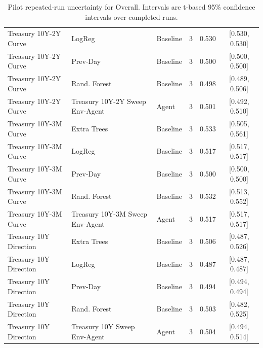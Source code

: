 \begin{table}[t]
\begin{tabular}{llllcc}
Treasury 10Y-2Y Curve & LogReg & Baseline & 3 & 0.530 & [0.530, 0.530] \\
Treasury 10Y-2Y Curve & Prev-Day & Baseline & 3 & 0.500 & [0.500, 0.500] \\
Treasury 10Y-2Y Curve & Rand. Forest & Baseline & 3 & 0.498 & [0.489, 0.506] \\
Treasury 10Y-2Y Curve & Treasury 10Y-2Y Sweep Env-Agent & Agent & 3 & 0.501 & [0.492, 0.510] \\
Treasury 10Y-3M Curve & Extra Trees & Baseline & 3 & 0.533 & [0.505, 0.561] \\
Treasury 10Y-3M Curve & LogReg & Baseline & 3 & 0.517 & [0.517, 0.517] \\
Treasury 10Y-3M Curve & Prev-Day & Baseline & 3 & 0.500 & [0.500, 0.500] \\
Treasury 10Y-3M Curve & Rand. Forest & Baseline & 3 & 0.532 & [0.513, 0.552] \\
Treasury 10Y-3M Curve & Treasury 10Y-3M Sweep Env-Agent & Agent & 3 & 0.517 & [0.517, 0.517] \\
Treasury 10Y Direction & Extra Trees & Baseline & 3 & 0.506 & [0.487, 0.526] \\
Treasury 10Y Direction & LogReg & Baseline & 3 & 0.487 & [0.487, 0.487] \\
Treasury 10Y Direction & Prev-Day & Baseline & 3 & 0.494 & [0.494, 0.494] \\
Treasury 10Y Direction & Rand. Forest & Baseline & 3 & 0.503 & [0.482, 0.525] \\
Treasury 10Y Direction & Treasury 10Y Sweep Env-Agent & Agent & 3 & 0.504 & [0.494, 0.514] \\
\bottomrule
\end{tabular}
\caption{Pilot repeated-run uncertainty for Overall. Intervals are t-based 95\% confidence intervals over completed runs.}
\label{tab:pilot-uncertainty-score-overall-score}
\end{table}
